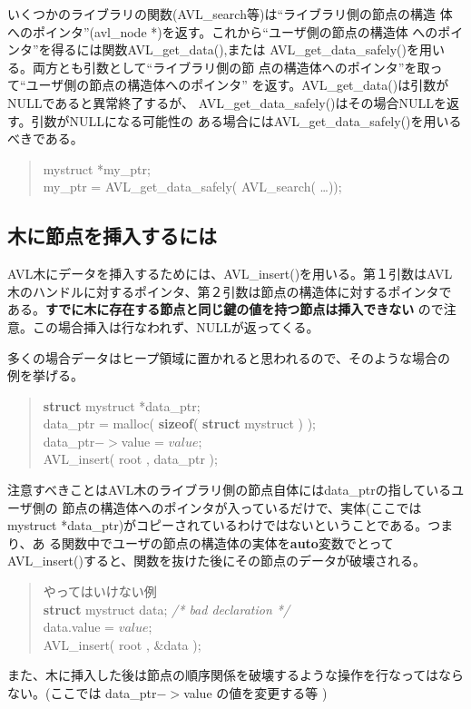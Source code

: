 いくつかのライブラリの関数(AVL\_search等)は``ライブラリ側の節点の構造
体へのポインタ''(avl\_node *)を返す。これから``ユーザ側の節点の構造体
へのポインタ''を得るには関数AVL\_get\_data(),または
AVL\_get\_data\_safely()を用いる。両方とも引数として``ライブラリ側の節
点の構造体へのポインタ''を取って``ユーザ側の節点の構造体へのポインタ''
を返す。AVL\_get\_data()は引数がNULLであると異常終了するが、
AVL\_get\_data\_safely()はその場合NULLを返す。引数がNULLになる可能性の
ある場合にはAVL\_get\_data\_safely()を用いるべきである。
\begin{quote}
mystruct *my\_ptr;\\
my\_ptr = AVL\_get\_data\_safely( AVL\_search( \ldots ));
\end{quote}

\subsection{木に節点を挿入するには}
AVL木にデータを挿入するためには、AVL\_insert()を用いる。第１引数はAVL
木のハンドルに対するポインタ、第２引数は節点の構造体に対するポインタで
ある。{\bf すでに木に存在する節点と同じ鍵の値を持つ節点は挿入できない}
ので注意。この場合挿入は行なわれず、NULLが返ってくる。

多くの場合データはヒープ領域に置かれると思われるので、そのような場合の
例を挙げる。
\begin{quote}
{\bf struct} mystruct *data\_ptr;\\
data\_ptr = malloc( {\bf sizeof}( {\bf struct} mystruct ) );\\
data\_ptr$->$value = $value$;\\
AVL\_insert( root , data\_ptr );
\end{quote}
注意すべきことはAVL木のライブラリ側の節点自体にはdata\_ptrの指しているユーザ側の
節点の構造体へのポインタが入っているだけで、実体(ここではmystruct
*data\_ptr)がコピーされているわけではないということである。つまり、あ
る関数中でユーザの節点の構造体の実体を{\bf auto}変数でとって
AVL\_insert()すると、関数を抜けた後にその節点のデータが破壊される。

\begin{quote}
やってはいけない例\\
{\bf struct} mystruct data; {\it /* bad declaration */}\\
data.value = $value$;\\
AVL\_insert( root , \&data );
\end{quote}

また、木に挿入した後は節点の順序関係を破壊するような操作を行なってはなら
ない。(ここでは data\_ptr$->$value の値を変更する等 )


